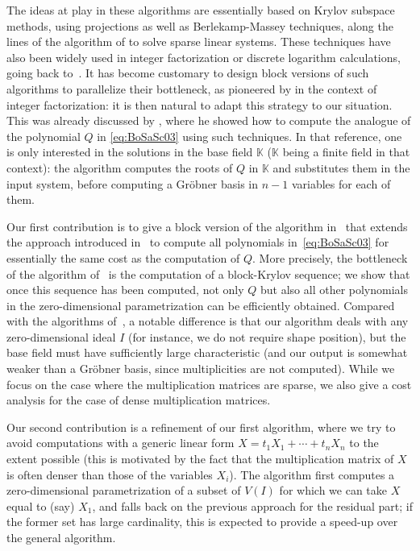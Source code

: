 \documentclass[final,1p,times,authoryear]{elsarticle}
\newcommand{\lf}{X}
\newcommand{\sqfree}{Q}
\def\K{\mathbb{K}}
\def\K {\ensuremath{\mathbb{K}}}
\begin{document}
The ideas at play in these algorithms are essentially based on Krylov subspace
methods, using projections as well as Berlekamp-Massey techniques, along the
lines of the algorithm of \citet{Wiedemann86} to solve sparse linear systems.
These techniques have also been widely used in integer
factorization or discrete logarithm calculations, going back to~\citep{LaOd90}.
It has become customary to design block versions of such algorithms to
parallelize their bottleneck, as pioneered by \citet{Coppersmith94}
in the context of integer factorization: it is then natural to adapt this
strategy to our situation. This was already discussed by
\citet{Steel15}, where he showed how to compute the analogue of the
polynomial $\sqfree$ in \cref{eq:BoSaSc03} using such techniques. In that
reference, one is only interested in the solutions in the base field $\K$ ($\K$
being a finite field in that context): the algorithm computes the roots of
$\sqfree$ in $\K$ and substitutes them in the input system, before computing a
Gr\"obner basis in $n-1$ variables for each of them.

Our first contribution is to give a block version of the algorithm
in~\citep{BoSaSc03} that extends the approach introduced
in~\citep{Steel15} to compute all polynomials in~\cref{eq:BoSaSc03} for
essentially the same cost as the computation of $\sqfree$. More
precisely, the bottleneck of the algorithm of~\citep{Steel15} is the
computation of a block-Krylov sequence; we show that once this
sequence has been computed, not only $\sqfree$ but also all other
polynomials in the zero-dimensional parametrization can be efficiently
obtained. Compared with the algorithms of~\citep{FaMo17}, a notable
difference is that our algorithm deals with any  zero-dimensional ideal
$I$ (for instance, we do not require shape position), but the
base field must have sufficiently large characteristic (and our output is
somewhat weaker than a Gr\"obner basis, since multiplicities are not
computed). While we focus on the case where the multiplication
matrices are sparse, we also give a cost analysis for the case of
dense multiplication matrices.

Our second contribution is a refinement of our first algorithm, where
we try to avoid computations with a generic linear form $\lf =t_1 X_1 +
\cdots + t_n X_n$ to the extent possible (this is motivated by the
fact that the multiplication matrix of $\lf$ is often denser than those
of the variables $X_i$). The algorithm first computes a zero-dimensional
parametrization of a subset of $V(I)$ for which we can take $\lf$
equal to (say) $X_1$, and falls back on the previous approach for the
residual part; if the former set has large cardinality, this is
expected to provide a speed-up over the general algorithm.
\end{document}
